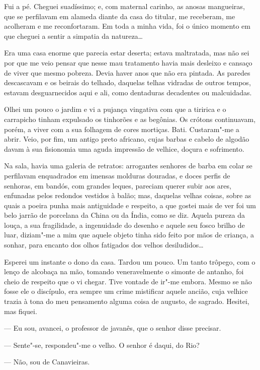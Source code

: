 Fui a pé. Cheguei suadíssimo; e, com maternal carinho, as anosas
mangueiras, que se perfilavam em alameda diante da casa do titular, me
receberam, me acolheram e me reconfortaram. Em toda a minha vida, foi o
único momento em que cheguei a sentir a simpatia da natureza\ldots{}

Era uma casa enorme que parecia estar deserta; estava maltratada, mas
não sei por que me veio pensar que nesse mau tratamento havia mais
desleixo e cansaço de viver que mesmo pobreza. Devia haver anos que não
era pintada. As paredes descascavam e os beirais do telhado, daquelas
telhas vidradas de outros tempos, estavam desguarnecidos aqui e ali,
como dentaduras decadentes ou malcuidadas.

Olhei um pouco o jardim e vi a pujança vingativa com que a tiririca e o
carrapicho tinham expulsado os tinhorões e as begônias. Os crótons
continuavam, porém, a viver com a sua folhagem de cores mortiças. Bati.
Custaram"-me a abrir. Veio, por fim, um antigo preto africano, cujas
barbas e cabelo de algodão davam à sua fisionomia uma aguda impressão de
velhice, doçura e sofrimento.

Na sala, havia uma galeria de retratos: arrogantes senhores de barba em
colar se perfilavam enquadrados em imensas molduras douradas, e doces
perfis de senhoras, em bandós, com grandes leques, pareciam querer subir
aos ares, enfunadas pelos redondos vestidos à balão; mas, daquelas
velhas coisas, sobre as quais a poeira punha mais antiguidade e
respeito, a que gostei mais de ver foi um belo jarrão de porcelana da
China ou da Índia, como se diz. Aquela pureza da louça, a sua
fragilidade, a ingenuidade do desenho e aquele seu fosco brilho de luar,
diziam"-me a mim que aquele objeto tinha sido feito por mãos de criança,
a sonhar, para encanto dos olhos fatigados dos velhos desiludidos\ldots{}

Esperei um instante o dono da casa. Tardou um pouco. Um tanto trôpego,
com o lenço de alcobaça na mão, tomando veneravelmente o simonte de
antanho, foi cheio de respeito que o vi chegar. Tive vontade de ir"-me
embora. Mesmo se não fosse ele o discípulo, era sempre um crime
mistificar aquele ancião, cuja velhice trazia à tona do meu pensamento
alguma coisa de augusto, de sagrado. Hesitei, mas fiquei.

--- Eu sou, avancei, o professor de javanês, que o senhor disse
precisar.

--- Sente"-se, respondeu"-me o velho. O senhor é daqui, do Rio?

--- Não, sou de Canavieiras.

